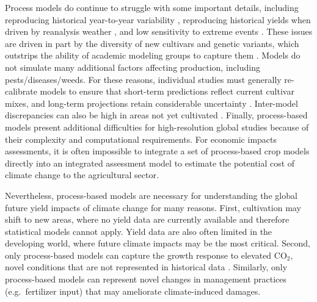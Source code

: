 \documentclass[preprint, 5p, times, twocolumn]{elsarticle}
\begin{document}
Process models do continue to struggle with some important details, including reproducing historical year-to-year variability \citep[e.g.\ ][]{muller_global_2017}, reproducing historical yields when driven by reanalysis weather \citep[e.g.\ ][]{Glotter14}, and low sensitivity to extreme events \citep[e.g.\ ][]{Glotter15}. These issues are driven in part by the diversity of new cultivars and genetic variants, which outstrips the ability of academic modeling groups to capture them \citep[e.g.\ ][]{JONES2017b}. Models do not simulate many additional factors affecting production, including pests/diseases/weeds. For these reasons, individual studies must generally re-calibrate models to ensure that short-term predictions reflect current cultivar mixes, and long-term projections retain considerable uncertainty \citep{WOLF2002217, JAGTAP200273, ANGULO201332, Asseng2013, Asseng2015}. Inter-model discrepancies can also be high in areas not yet cultivated \citep[e.g.\ ][]{Challinor2014, WHITE2011357}. Finally, process-based models present additional difficulties for high-resolution global studies because of their complexity and computational requirements. For economic impacts assessments, it is often impossible to integrate a set of process-based crop models directly into an integrated assessment model to estimate the potential cost of climate change to the agricultural sector.

Nevertheless, process-based models are necessary for understanding the global future yield impacts of climate change for many reasons. First, cultivation may shift to new areas, where no yield data are currently available and therefore statistical models cannot apply. Yield data are also often limited in the developing world, where future climate impacts may be the most critical.  Second, only process-based models can capture the growth response to elevated CO$_2$, novel conditions that are not represented in historical data \citep[e.g.\ ][]{pugh_climate_2016, Roberts2017}. Similarly, only process-based models can represent novel changes in management practices (e.g.\ fertilizer input) that may ameliorate climate-induced damages.
\end{document}
